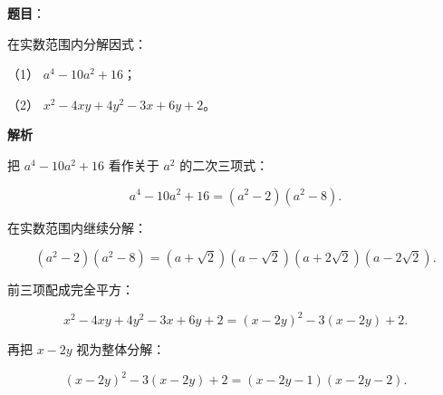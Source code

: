 \begin{answer}

\textbf{题目}：

在实数范围内分解因式：

（1） $a^4-10a^2+16$；

（2） $x^2-4xy+4y^2-3x+6y+2$。

\textbf{解析}


把 $a^4-10a^2+16$ 看作关于 $a^2$ 的二次三项式：

\nopagebreak[4]
\[
a^4-10a^2+16=(a^2-2)(a^2-8).
\]

在实数范围内继续分解：

\nopagebreak[4]
\[
(a^2-2)(a^2-8)=(a+\sqrt2)(a-\sqrt2)(a+2\sqrt2)(a-2\sqrt2).
\]


前三项配成完全平方：

\nopagebreak[4]
\[
x^2-4xy+4y^2-3x+6y+2=(x-2y)^2-3(x-2y)+2.
\]

再把 $x-2y$ 视为整体分解：

\nopagebreak[4]
\[
(x-2y)^2-3(x-2y)+2=(x-2y-1)(x-2y-2).
\]



\end{answer}
